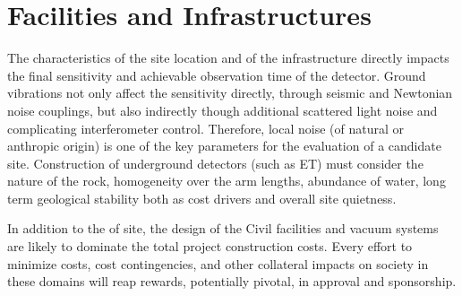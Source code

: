 \chapter{Facilities and Infrastructures}
\label{sec:Fac_Inf}
The characteristics of the site location and of the infrastructure directly impacts the final sensitivity and achievable observation time of the detector. Ground vibrations not only affect the sensitivity directly, through seismic and Newtonian noise couplings, but 
also indirectly though additional scattered light noise and 
complicating interferometer control.
Therefore, local noise (of natural or anthropic origin) is one of the key parameters for the evaluation of a candidate site.  Construction of underground detectors (such as ET) must consider the nature of the rock, homogeneity over the arm lengths, abundance of water, long term geological stability both as cost drivers and overall site quietness. 

In addition to the of site, the design of the 
Civil facilities and vacuum systems are likely to dominate the total project construction costs.  Every effort to minimize costs, cost %
contingencies, and other collateral impacts on society in these domains will reap rewards,  potentially pivotal, in approval and sponsorship. 

